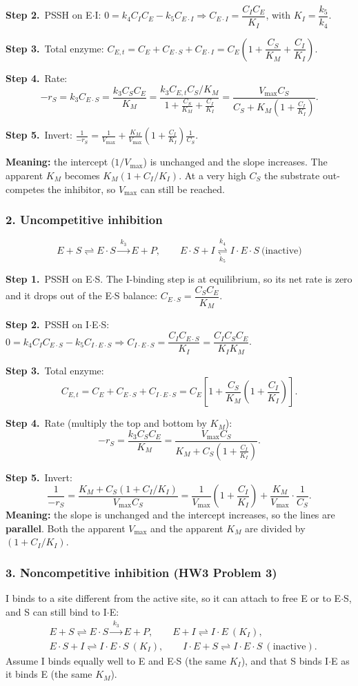 \documentclass[11pt]{article}
\newcommand{\step}[1]{\par\smallskip\textcolor{stepgray}{\textbf{Step #1.}}\ }
\newcommand{\rxn}[1]{\xrightarrow{\;#1\;}}
\begin{document}
\step{2}PSSH on E$\cdot$I: $0=k_4C_IC_E-k_5C_{E\cdot I}\Rightarrow C_{E\cdot I}=\dfrac{C_IC_E}{K_I}$, with $K_I=\dfrac{k_5}{k_4}$.

\step{3}Total enzyme:
$C_{E,t}=C_E+C_{E\cdot S}+C_{E\cdot I}=C_E\left(1+\dfrac{C_S}{K_M}+\dfrac{C_I}{K_I}\right)$.

\step{4}Rate:
\[
-r_S=k_3C_{E\cdot S}=\frac{k_3C_SC_E}{K_M}=\frac{k_3C_{E,t}C_S/K_M}{1+\frac{C_S}{K_M}+\frac{C_I}{K_I}}
=\frac{V_{\max}C_S}{C_S+K_M\left(1+\frac{C_I}{K_I}\right)}.
\]
\step{5}Invert:
$\displaystyle\frac{1}{-r_S}=\frac{1}{V_{\max}}+\frac{K_M}{V_{\max}}\left(1+\frac{C_I}{K_I}\right)\frac{1}{C_S}$.

\textbf{Meaning:} the intercept ($1/V_{\max}$) is unchanged and the slope increases. The apparent $K_M$ becomes
$K_M(1+C_I/K_I)$. At a very high $C_S$ the substrate out-competes the inhibitor, so $V_{\max}$ can still be reached.

\subsubsection*{2. Uncompetitive inhibition}
\[
E+S\rightleftharpoons E\cdot S\rxn{k_3}E+P,\qquad
E\cdot S+I\underset{k_5}{\overset{k_4}{\rightleftharpoons}}I\cdot E\cdot S\ \text{(inactive)}
\]
\step{1}PSSH on E$\cdot$S. The I-binding step is at equilibrium, so its net rate is zero and it drops out of the E$\cdot$S balance:
$C_{E\cdot S}=\dfrac{C_SC_E}{K_M}$.

\step{2}PSSH on I$\cdot$E$\cdot$S: $0=k_4C_IC_{E\cdot S}-k_5C_{I\cdot E\cdot S}\Rightarrow C_{I\cdot E\cdot S}=\dfrac{C_IC_{E\cdot S}}{K_I}=\dfrac{C_IC_SC_E}{K_IK_M}$.

\step{3}Total enzyme:
\[
C_{E,t}=C_E+C_{E\cdot S}+C_{I\cdot E\cdot S}=C_E\left[1+\frac{C_S}{K_M}\left(1+\frac{C_I}{K_I}\right)\right].
\]
\step{4}Rate (multiply the top and bottom by $K_M$):
\[
-r_S=\frac{k_3C_SC_E}{K_M}=\frac{V_{\max}C_S}{K_M+C_S\left(1+\frac{C_I}{K_I}\right)}.
\]
\step{5}Invert:
\[
\frac{1}{-r_S}=\frac{K_M+C_S(1+C_I/K_I)}{V_{\max}C_S}
=\frac{1}{V_{\max}}\left(1+\frac{C_I}{K_I}\right)+\frac{K_M}{V_{\max}}\cdot\frac{1}{C_S}.
\]
\textbf{Meaning:} the slope is unchanged and the intercept increases, so the lines are \textbf{parallel}.
Both the apparent $V_{\max}$ and the apparent $K_M$ are divided by $(1+C_I/K_I)$.

\subsubsection*{3. Noncompetitive inhibition (HW3 Problem 3)}
I binds to a site different from the active site, so it can attach to free E or to E$\cdot$S, and S can still bind to I$\cdot$E:
\[
\begin{aligned}
&E+S\rightleftharpoons E\cdot S\rxn{k_3}E+P, \qquad
E+I\rightleftharpoons I\cdot E\ (K_I),\\
&E\cdot S+I\rightleftharpoons I\cdot E\cdot S\ (K_I),\qquad
I\cdot E+S\rightleftharpoons I\cdot E\cdot S\ (\text{inactive}).
\end{aligned}
\]
Assume I binds equally well to E and E$\cdot$S (the same $K_I$), and that S binds I$\cdot$E as it binds E (the same $K_M$).
\end{document}
